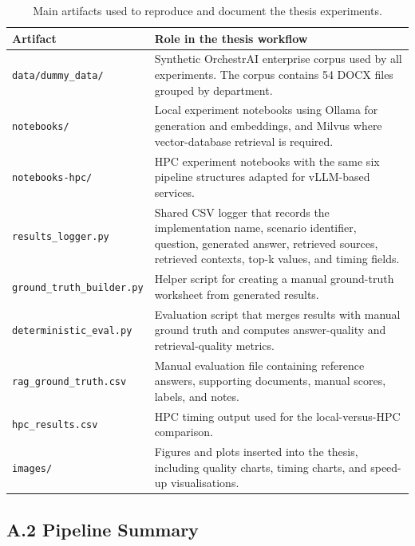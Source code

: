 \begin{table}[H]
\centering
\small
\begin{tabularx}{\textwidth}{>{\raggedright\arraybackslash}p{}>{\raggedright\arraybackslash}X}
\toprule
\textbf{Artifact} & \textbf{Role in the thesis workflow} \\
\midrule
\texttt{data/dummy\_data/} & Synthetic OrchestrAI enterprise corpus used by all experiments. The corpus contains 54 DOCX files grouped by department. \\
\texttt{notebooks/} & Local experiment notebooks using Ollama for generation and embeddings, and Milvus where vector-database retrieval is required. \\
\texttt{notebooks-hpc/} & \ac{HPC} experiment notebooks with the same six pipeline structures adapted for vLLM-based services. \\
\texttt{results\_logger.py} & Shared CSV logger that records the implementation name, scenario identifier, question, generated answer, retrieved sources, retrieved contexts, top-k values, and timing fields. \\
\texttt{ground\_truth\_builder.py} & Helper script for creating a manual ground-truth worksheet from generated results. \\
\texttt{deterministic\_eval.py} & Evaluation script that merges results with manual ground truth and computes answer-quality and retrieval-quality metrics. \\
\texttt{rag\_ground\_truth.csv} & Manual evaluation file containing reference answers, supporting documents, manual scores, labels, and notes. \\
\texttt{hpc\_results.csv} & \ac{HPC} timing output used for the local-versus-\ac{HPC} comparison. \\
\texttt{images/} & Figures and plots inserted into the thesis, including quality charts, timing charts, and speed-up visualisations. \\
\bottomrule
\end{tabularx}
\caption{Main artifacts used to reproduce and document the thesis experiments.}
\label{tab:appendix-artifact-map}
\end{table}

\subsection*{A.2 Pipeline Summary}

